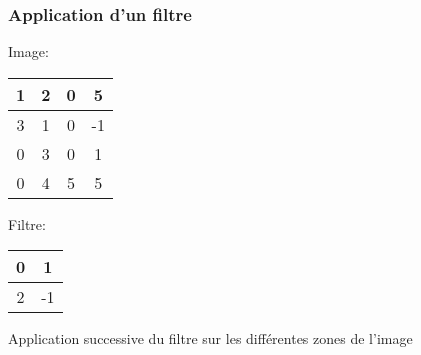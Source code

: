 \documentclass{formation}
\begin{document}
\begin{frame}
  \frametitle{Application d'un filtre}
  \begin{multicols}{2}
    Image:
    \begin{tabular}{|c|c|c|c|}
      \hline
      1 & 2 & 0 & 5 \\
      \hline
      3 & 1 & 0 & -1 \\
      \hline
      0 & 3 & 0 & 1 \\
      \hline
      0 & 4 & 5 & 5 \\
      \hline
    \end{tabular}

    \columnbreak

    Filtre:
    \begin{tabular}{|c|c|}
      \hline
      0 & 1 \\
      \hline
      2 & -1 \\
      \hline
    \end{tabular}
    \vfill
  \end{multicols}
  Application successive du filtre sur les différentes zones de l'image
\end{frame}
\end{document}
